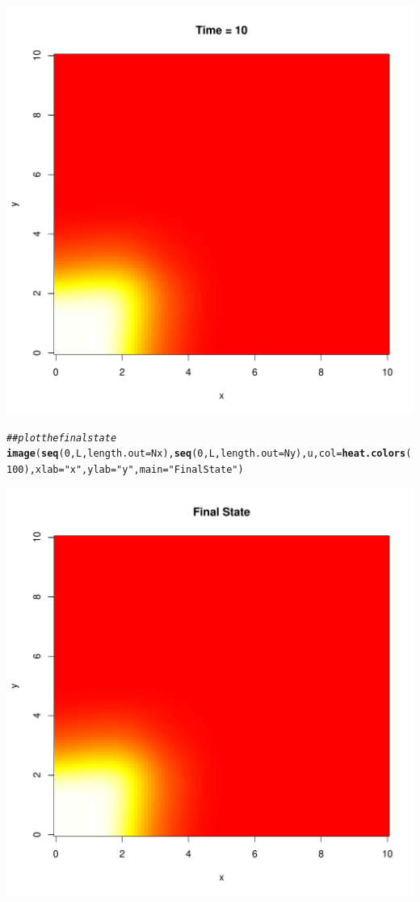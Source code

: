 \documentclass{tufte-handout}\usepackage[]{graphicx}\usepackage[]{xcolor}
\makeatletter
\def\maxwidth{ %
  \ifdim\Gin@nat@width>\linewidth
    \linewidth
  \else
    \Gin@nat@width
  \fi
}
\newcommand{\hlnum}[1]{\textcolor[rgb]{0.686,0.059,0.569}{#1}}%
\newcommand{\hlstr}[1]{\textcolor[rgb]{0.192,0.494,0.8}{#1}}%
\newcommand{\hlcom}[1]{\textcolor[rgb]{0.678,0.584,0.686}{\textit{#1}}}%
\newcommand{\hlstd}[1]{\textcolor[rgb]{0.345,0.345,0.345}{#1}}%
\newcommand{\hlkwc}[1]{\textcolor[rgb]{0.333,0.667,0.333}{#1}}%
\newcommand{\hlkwd}[1]{\textcolor[rgb]{0.737,0.353,0.396}{\textbf{#1}}}%
\newenvironment{kframe}{%
 \def\at@end@of@kframe{}%
 \ifinner\ifhmode%
  \def\at@end@of@kframe{\end{minipage}}%
  \begin{minipage}{\columnwidth}%
 \fi\fi%
 \def\FrameCommand##1{\hskip\@totalleftmargin \hskip-\fboxsep
 \colorbox{shadecolor}{##1}\hskip-\fboxsep
     \hskip-\linewidth \hskip-\@totalleftmargin \hskip\columnwidth}%
 \MakeFramed {\advance\hsize-\width
   \@totalleftmargin\z@ \linewidth\hsize
   \@setminipage}}%
 {\par\unskip\endMakeFramed%
 \at@end@of@kframe}
\newenvironment{knitrout}{}{} %
\makeatother
\begin{document}
\begin{knitrout}
\includegraphics[width=\maxwidth]{figure/unnamed-chunk-4-11} 
\begin{kframe}\begin{alltt}
\hlcom{## plot the final state}
\hlkwd{image}\hlstd{(}\hlkwd{seq}\hlstd{(}\hlnum{0}\hlstd{, L,} \hlkwc{length.out} \hlstd{= Nx),} \hlkwd{seq}\hlstd{(}\hlnum{0}\hlstd{, L,} \hlkwc{length.out} \hlstd{= Ny), u,} \hlkwc{col} \hlstd{=} \hlkwd{heat.colors}\hlstd{(}\hlnum{100}\hlstd{),} \hlkwc{xlab} \hlstd{=} \hlstr{"x"}\hlstd{,} \hlkwc{ylab} \hlstd{=} \hlstr{"y"}\hlstd{,} \hlkwc{main} \hlstd{=} \hlstr{"Final State"}\hlstd{)}
\end{alltt}
\end{kframe}
\includegraphics[width=\maxwidth]{figure/unnamed-chunk-4-12} 
\end{knitrout}
\end{document}
